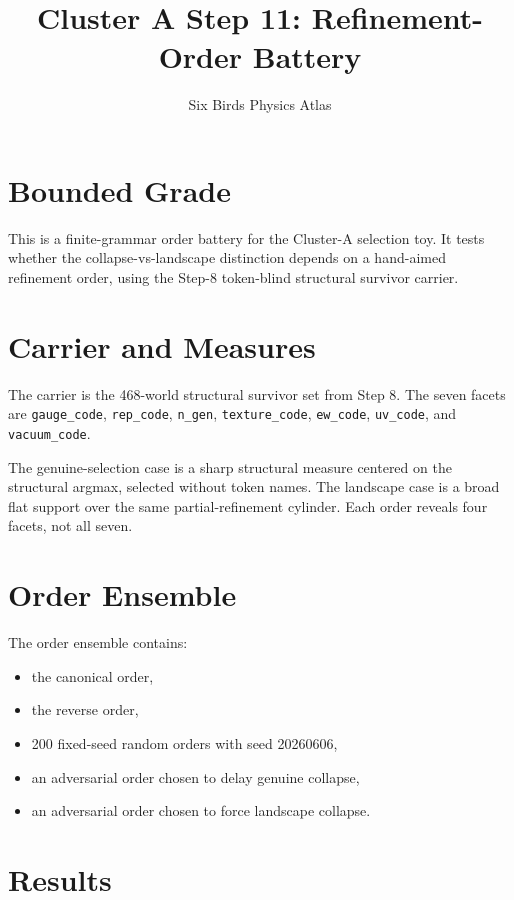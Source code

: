 \documentclass[11pt]{article}
\title{Cluster A Step 11: Refinement-Order Battery}
\author{Six Birds Physics Atlas}
\date{}
\begin{document}
\maketitle

\section*{Bounded Grade}

This is a finite-grammar order battery for the Cluster-A selection toy. It tests whether the collapse-vs-landscape distinction depends on a hand-aimed refinement order, using the Step-8 token-blind structural survivor carrier.

\section*{Carrier and Measures}

The carrier is the 468-world structural survivor set from Step 8. The seven facets are \texttt{gauge\_code}, \texttt{rep\_code}, \texttt{n\_gen}, \texttt{texture\_code}, \texttt{ew\_code}, \texttt{uv\_code}, and \texttt{vacuum\_code}.

The genuine-selection case is a sharp structural measure centered on the structural argmax, selected without token names. The landscape case is a broad flat support over the same partial-refinement cylinder. Each order reveals four facets, not all seven.

\section*{Order Ensemble}

The order ensemble contains:

\begin{itemize}
\item the canonical order,
\item the reverse order,
\item 200 fixed-seed random orders with seed 20260606,
\item an adversarial order chosen to delay genuine collapse,
\item an adversarial order chosen to force landscape collapse.
\end{itemize}

\section*{Results}
\end{document}
